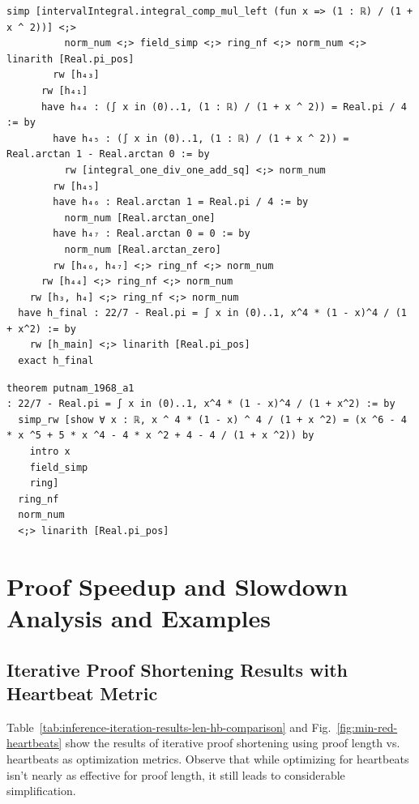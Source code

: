 \begin{tcolorbox}[colback=lightblue, boxrule=0pt, arc=5pt, outer arc=5pt, before skip=0pt, after skip=0pt, boxsep=0pt]
\begin{minipage}[t]{0.99\textwidth}
\begin{lstlisting}[language=lean, breaklines=true, style=mystyletiny]
          simp [intervalIntegral.integral_comp_mul_left (fun x => (1 : ℝ) / (1 + x ^ 2))] <;> 
          norm_num <;> field_simp <;> ring_nf <;> norm_num <;> linarith [Real.pi_pos]
        rw [h₄₃]
      rw [h₄₁]
      have h₄₄ : (∫ x in (0)..1, (1 : ℝ) / (1 + x ^ 2)) = Real.pi / 4 := by
        have h₄₅ : (∫ x in (0)..1, (1 : ℝ) / (1 + x ^ 2)) = Real.arctan 1 - Real.arctan 0 := by
          rw [integral_one_div_one_add_sq] <;> norm_num
        rw [h₄₅]
        have h₄₆ : Real.arctan 1 = Real.pi / 4 := by
          norm_num [Real.arctan_one]
        have h₄₇ : Real.arctan 0 = 0 := by
          norm_num [Real.arctan_zero]
        rw [h₄₆, h₄₇] <;> ring_nf <;> norm_num
      rw [h₄₄] <;> ring_nf <;> norm_num
    rw [h₃, h₄] <;> ring_nf <;> norm_num
  have h_final : 22/7 - Real.pi = ∫ x in (0)..1, x^4 * (1 - x)^4 / (1 + x^2) := by
    rw [h_main] <;> linarith [Real.pi_pos]
  exact h_final
\end{lstlisting}
\end{minipage}

\begin{minipage}[t]{0.99\textwidth}
\begin{lstlisting}[caption={Original Proof (Length 1097) and Simplified Proof (Length 76)},label={lst:examples-tail}, language=lean, breaklines=true, style=mystyletiny]
theorem putnam_1968_a1
: 22/7 - Real.pi = ∫ x in (0)..1, x^4 * (1 - x)^4 / (1 + x^2) := by
  simp_rw [show ∀ x : ℝ, x ^ 4 * (1 - x) ^ 4 / (1 + x ^2) = (x ^6 - 4 * x ^5 + 5 * x ^4 - 4 * x ^2 + 4 - 4 / (1 + x ^2)) by
    intro x
    field_simp
    ring]
  ring_nf
  norm_num
  <;> linarith [Real.pi_pos]
\end{lstlisting}
\end{minipage}
\end{tcolorbox}


  
\newpage

\section{Proof Speedup and Slowdown Analysis and Examples} 

\subsection{Iterative Proof Shortening Results with Heartbeat Metric} \label{sec:appendix-heartbeats}

Table~\ref{tab:inference-iteration-results-len-hb-comparison} and Fig.~\ref{fig:min-red-heartbeats} show the results of iterative proof shortening using proof length vs. heartbeats as optimization metrics. Observe that while optimizing for heartbeats isn't nearly as effective for proof length, it still leads to considerable simplification. 

